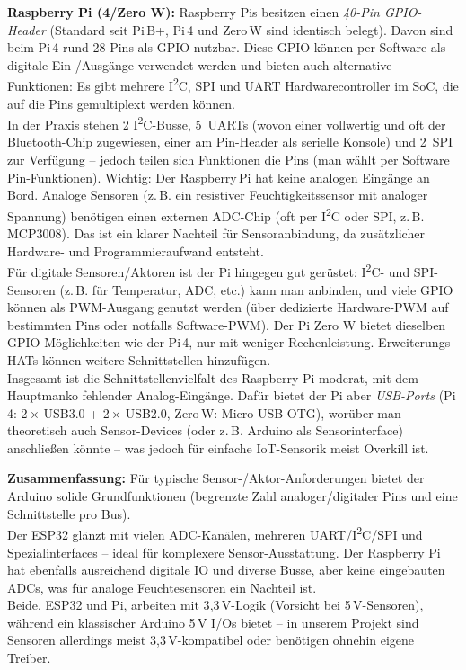 \noindent\textbf{Raspberry Pi (4/Zero W):} Raspberry Pis besitzen einen \textit{40-Pin GPIO-Header} (Standard seit Pi\,B+, Pi\,4 und Zero\,W sind identisch belegt). Davon sind beim Pi\,4 rund 28 Pins als GPIO nutzbar. \autocite{raspberry_pi_datasheet} Diese GPIO können per Software als digitale Ein-/Ausgänge verwendet werden und bieten auch alternative Funktionen: Es gibt mehrere I\textsuperscript{2}C, SPI und UART Hardwarecontroller im SoC, die auf die Pins gemultiplext werden können. \autocite{raspberry_pi_datasheet} 
\\
In der Praxis stehen 2 I\textsuperscript{2}C-Busse, 5~UARTs (wovon einer vollwertig und oft der Bluetooth-Chip zugewiesen, einer am Pin-Header als serielle Konsole) und 2~SPI zur Verfügung – jedoch teilen sich Funktionen die Pins (man wählt per Software Pin-Funktionen). Wichtig: Der Raspberry\,Pi hat keine analogen Eingänge an Bord. Analoge Sensoren (z.\,B. ein resistiver Feuchtigkeitssensor mit analoger Spannung) benötigen einen externen ADC-Chip (oft per I\textsuperscript{2}C oder SPI, z.\,B. MCP3008). Das ist ein klarer Nachteil für Sensoranbindung, da zusätzlicher Hardware- und Programmieraufwand entsteht. 
\\
Für digitale Sensoren/Aktoren ist der Pi hingegen gut gerüstet: I\textsuperscript{2}C- und SPI-Sensoren (z.\,B. für Temperatur, ADC, etc.) kann man anbinden, und viele GPIO können als PWM-Ausgang genutzt werden (über dedizierte Hardware-PWM auf bestimmten Pins oder notfalls Software-PWM). Der Pi Zero W bietet dieselben GPIO-Möglichkeiten wie der Pi\,4, nur mit weniger Rechenleistung. Erweiterungs-HATs können weitere Schnittstellen hinzufügen. 
\\
Insgesamt ist die Schnittstellenvielfalt des Raspberry Pi moderat, mit dem Hauptmanko fehlender Analog-Eingänge. Dafür bietet der Pi aber \textit{USB-Ports} (Pi\,4: 2\,$\times$ USB3.0 + 2\,$\times$ USB2.0, \autocite{raspberry_pi_datasheet} Zero\,W: Micro-USB OTG), worüber man theoretisch auch Sensor-Devices (oder z.\,B. Arduino als Sensorinterface) anschließen könnte – was jedoch für einfache IoT-Sensorik meist Overkill ist.


\vspace{5mm}

\noindent\textbf{Zusammenfassung:} Für typische Sensor-/Aktor-Anforderungen bietet der Arduino solide Grundfunktionen (begrenzte Zahl analoger/digitaler Pins und eine Schnittstelle pro Bus). 
\\
Der ESP32 glänzt mit vielen ADC-Kanälen, mehreren UART/I\textsuperscript{2}C/SPI und Spezialinterfaces – ideal für komplexere Sensor-Ausstattung. Der Raspberry Pi hat ebenfalls ausreichend digitale IO und diverse Busse, aber keine eingebauten ADCs, was für analoge Feuchtesensoren ein Nachteil ist. 
\\
Beide, ESP32 und Pi, arbeiten mit 3{,}3\,V-Logik (Vorsicht bei 5\,V-Sensoren), während ein klassischer Arduino 5\,V I/Os bietet – in unserem Projekt sind Sensoren allerdings meist 3{,}3\,V-kompatibel oder benötigen ohnehin eigene Treiber.

